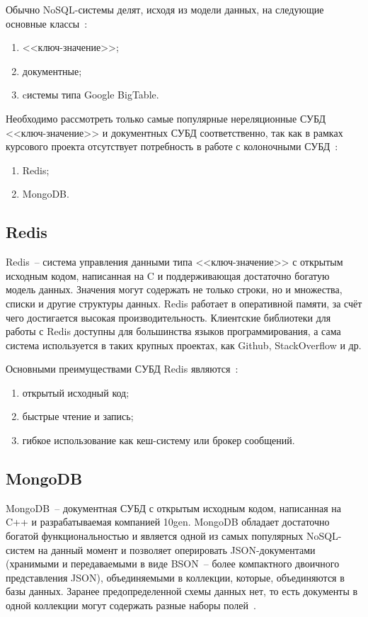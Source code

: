 Обычно NoSQL-системы делят, исходя из модели данных, на следующие основные классы~\cite{nosql}:
\begin{enumerate}
	\item <<ключ-значение>>;
	\item документные;
	\item cистемы типа Google BigTable.
\end{enumerate}

Необходимо рассмотреть только самые популярные нереляционные СУБД <<ключ-значение>> и документных СУБД соответственно, так как в рамках курсового проекта отсутствует потребность в работе с колоночными СУБД~\cite{popularDB}:
\begin{enumerate}
	\item Redis;
	\item MongoDB.
\end{enumerate}

\subsection{Redis}

Redis~-- система управления данными типа <<ключ-значение>> с открытым исходным кодом, написанная на C и поддерживающая достаточно богатую модель данных.
Значения могут содержать не только строки, но и множества, списки и другие структуры данных.
Redis работает в оперативной памяти, за счёт чего достигается высокая производительность. 
Клиентские библиотеки для работы с Redis доступны для большинства языков программирования, а сама система используется в таких крупных проектах, как Github, StackOverflow и др.

Основными преимуществами СУБД Redis являются~\cite{cmpNosql1}:
\begin{enumerate}
	\item открытый исходный код;
	\item быстрые чтение и запись;
	\item гибкое использование как кеш-систему или брокер сообщений.
\end{enumerate}

\subsection{MongoDB}

MongoDB~-- документная СУБД с открытым исходным кодом, написанная на C++ и разрабатываемая компанией 10gen.
MongoDB обладает достаточно богатой функциональностью и является одной из самых популярных NoSQL-систем на данный момент и позволяет оперировать JSON-документами (хранимыми и передаваемыми в виде BSON~-- более компактного двоичного представления JSON), объединяемыми в коллекции, которые, объединяются в базы данных.
Заранее предопределенной схемы данных нет, то есть документы в одной коллекции могут содержать разные наборы полей~\cite{nosql}.

